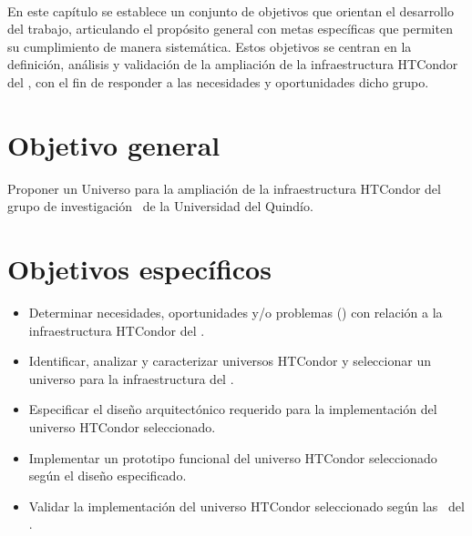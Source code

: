 \label{cap:objetivos}
\mbox{}\\
En este capítulo se establece un conjunto de objetivos que orientan el desarrollo del trabajo, articulando el propósito general con metas específicas que permiten su cumplimiento de manera sistemática. Estos objetivos se centran en la definición, análisis y validación de la ampliación de la infraestructura HTCondor del \GRID, con el fin de responder a las necesidades y oportunidades dicho grupo. 

\section{Objetivo general}\label{cap:objetivoGeneral}

Proponer un Universo para la ampliación de la infraestructura HTCondor del grupo de investigación \GRID~de la Universidad del Quindío.


\section{Objetivos específicos}\label{cap:objetivosEspecificos}
\begin{itemize}
    \item Determinar necesidades, oportunidades y/o problemas (\NPO) con relación a la infraestructura HTCondor del \GRID.
    
    \item Identificar, analizar y caracterizar universos HTCondor y seleccionar un universo para la infraestructura del \GRID.
    
    \item Especificar el diseño arquitectónico requerido para la implementación del universo HTCondor seleccionado.
    
    \item Implementar un prototipo funcional del universo HTCondor seleccionado según el diseño especificado.
    
    \item Validar la implementación del universo HTCondor seleccionado según las \NPO~del \GRID.
\end{itemize}
